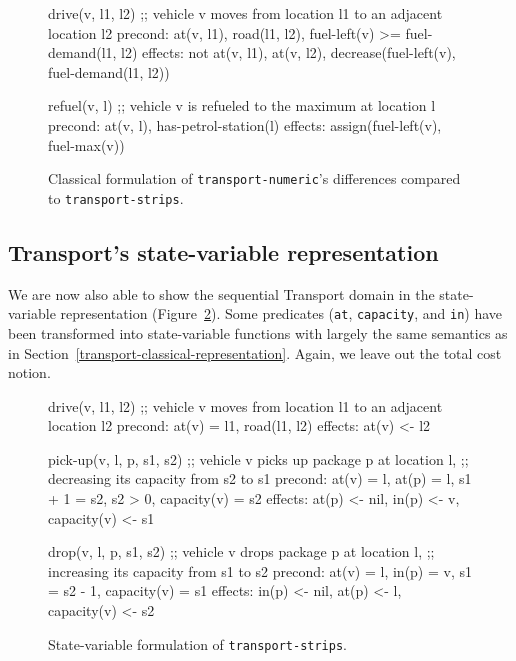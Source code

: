 \begin{figure}[tbp]
\begin{code}
drive(v, l1, l2)
  ;; vehicle v moves from location l1 to an adjacent location l2
  precond: at(v, l1), road(l1, l2), fuel-left(v) >= fuel-demand(l1, l2)
  effects: not at(v, l1), at(v, l2),
           decrease(fuel-left(v),  fuel-demand(l1, l2))
  
refuel(v, l)
  ;; vehicle v is refueled to the maximum at location l
  precond: at(v, l), has-petrol-station(l)
  effects: assign(fuel-left(v), fuel-max(v))
\end{code}
\caption[Partial classical formulation of \texttt{transport-numeric}.]{Classical formulation of \texttt{transport-numeric}'s differences compared to \texttt{transport-strips}.}
\label{code:classical-numeric}
\end{figure}

\subsection{Transport's state-variable representation}

We are now also able to show the sequential Transport domain
in the state-variable representation (Figure~\ref{code:statevar-strips}).
Some predicates (\verb+at+, \verb+capacity+, and \verb+in+) have been transformed
into state-variable functions with largely the same semantics as in
Section~\ref{transport-classical-representation}. Again, we leave out
the total cost notion.

\begin{figure}[tbp]
\begin{code}
drive(v, l1, l2)
  ;; vehicle v moves from location l1 to an adjacent location l2
  precond: at(v) = l1, road(l1, l2)
  effects: at(v) <- l2

pick-up(v, l, p, s1, s2)
  ;; vehicle v picks up package p at location l,
  ;; decreasing its capacity from s2 to s1
  precond: at(v) = l, at(p) = l, s1 + 1 = s2, s2 > 0, capacity(v) = s2
  effects: at(p) <- nil, in(p) <- v, capacity(v) <- s1
  
drop(v, l, p, s1, s2)
  ;; vehicle v drops package p at location l,
  ;; increasing its capacity from s1 to s2
  precond: at(v) = l, in(p) = v, s1 = s2 - 1, capacity(v) = s1
  effects: in(p) <- nil, at(p) <- l, capacity(v) <- s2
\end{code}
\caption{State-variable formulation of \texttt{transport-strips}.}
\label{code:statevar-strips}
\end{figure}

